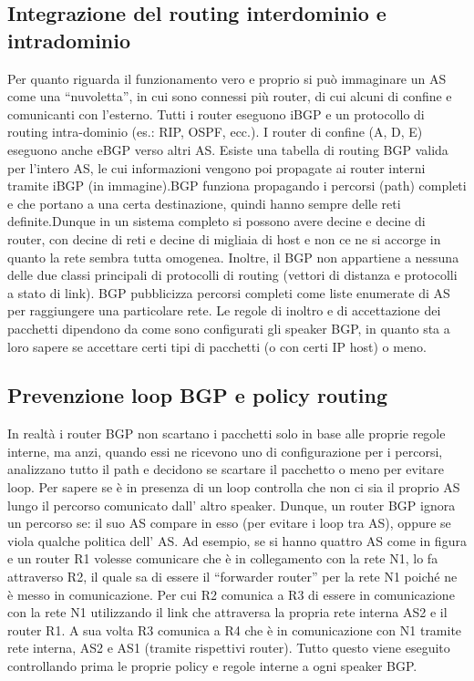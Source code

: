 \subsection{Integrazione del routing interdominio e intradominio}
Per quanto riguarda il funzionamento vero e proprio si può immaginare un AS come una “nuvoletta”, in cui sono connessi più router, di cui alcuni di confine e comunicanti con l’esterno. Tutti i router eseguono iBGP e un protocollo di routing intra-dominio (es.: RIP, OSPF, ecc.). I router di confine (A, D, E) eseguono anche eBGP verso altri AS. Esiste una tabella di routing BGP valida per l’intero AS, le cui informazioni vengono poi propagate ai router interni tramite iBGP (in immagine).BGP funziona propagando i percorsi (path) completi e che portano a una certa destinazione, quindi hanno sempre delle reti definite.Dunque in un sistema completo si possono avere decine e decine di router, con decine di reti e decine di migliaia di host e non ce ne si accorge in quanto la rete sembra tutta omogenea. Inoltre, il BGP non appartiene a nessuna delle due classi principali di protocolli di routing (vettori di distanza e protocolli a stato di link). BGP pubblicizza percorsi completi come liste enumerate di AS per raggiungere una particolare rete. Le regole di inoltro e di accettazione dei pacchetti dipendono da come sono configurati gli speaker BGP, in quanto sta a loro sapere se accettare certi tipi di pacchetti (o con certi IP host) o meno.
\subsection{Prevenzione loop BGP e policy routing}
In realtà i router BGP non scartano i pacchetti solo in base alle proprie regole interne, ma anzi, quando essi ne ricevono uno di configurazione per i percorsi, analizzano tutto il path e decidono se scartare il pacchetto o meno per evitare loop. Per sapere se è in presenza di un loop controlla che non ci sia il proprio AS lungo il percorso comunicato dall’ altro speaker. Dunque, un router BGP ignora un percorso se: il suo AS compare in esso (per evitare i loop tra AS), oppure se viola qualche politica dell’ AS. Ad esempio, se si hanno quattro AS come in figura e un router R1 volesse comunicare che è in collegamento con la rete N1, lo fa attraverso R2, il quale sa di essere il “forwarder router” per la rete N1 poiché ne è messo in comunicazione. Per cui R2 comunica a R3 di essere in comunicazione con la rete N1 utilizzando il link che attraversa la propria rete interna AS2 e il router R1. A sua volta R3 comunica a R4 che è in comunicazione con N1 tramite rete interna, AS2 e AS1 (tramite rispettivi router). Tutto questo viene eseguito controllando prima le proprie policy e regole interne a ogni speaker BGP.
